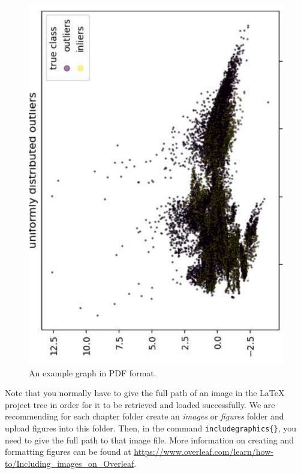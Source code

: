 \begin{figure}[!ht]
  \centering
  \includegraphics[angle=-90,scale=0.4]
    {manual/images/graph_a.pdf}
  \caption{An example graph in PDF format.}
  \label{fig:SimpleFigure}
\end{figure}

Note that you normally have to give the full path of an image in the \LaTeX{} project tree in order for it to be retrieved and loaded successfully.
We are recommending for each chapter folder create an  \emph{images} or  \emph{figures} folder and upload figures into this folder. Then, in the command \verb|includegraphics{}|, you need to give the full path to that image file. 
More information on creating and formatting figures can be found at \url{https://www.overleaf.com/learn/how-to/Including_images_on_Overleaf}.


